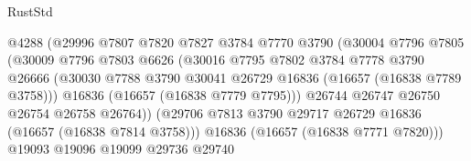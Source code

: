 \begin{lexlean}{RustStd}
\begin{coremodule}
                                      @4288
                                      (@29996
                                        @7807
                                        @7820
                                        @7827
                                        @3784
                                        @7770
                                        @3790
                                        (@30004
                                          @7796
                                          @7805
                                          (@30009
                                            @7796
                                            @7803
                                            @6626
                                            (@30016
                                              @7795
                                              @7802
                                              @3784
                                              @7778
                                              @3790
                                              @26666
                                              (@30030
                                                @7788
                                                @3790
                                                @30041
                                                @26729
                                                @16836
                                                (@16657 (@16838 @7789 @3758)))
                                              @16836
                                              (@16657 (@16838 @7779 @7795)))
                                            @26744
                                            @26747
                                            @26750
                                            @26754
                                            @26758
                                            @26764))
                                        (@29706
                                          @7813
                                          @3790
                                          @29717
                                          @26729
                                          @16836
                                          (@16657 (@16838 @7814 @3758)))
                                        @16836
                                        (@16657 (@16838 @7771 @7820)))
                                      @19093
                                      @19096
                                      @19099
                                      @29736
                                      @29740

\end{coremodule}
\end{lexlean}
